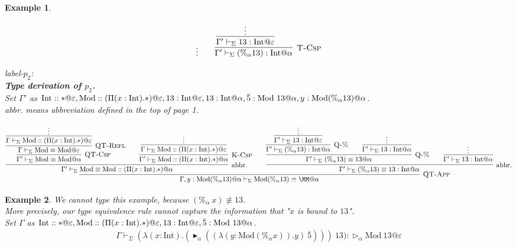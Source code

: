 \documentclass[9pt, a4paper]{extarticle}
\theoremstyle{break}
\newtheorem{ex}{Example}
\newcommand{\G}{\Gamma}
\newcommand{\V}{\vdash_\Sigma}
\newcommand{\TW}{\triangleright}
\newcommand{\TB}{\blacktriangleright}
\newcommand{\E}{\equiv}
\begin{document}
\begin{ex}
\begin{center}
$${{{							{\vdots}
						}
						\andalso
						\infer[\textsc{T-Csp}]
						{\G'\V (\%_\alpha 13):\I@\alpha}
						{
							\infer[]
							{\G'\V 13:\I@\varepsilon}
							{\vdots}
							\andalso
						}
					}
				}
			$$
		\end{center}
		label-$p_2$:\\
		{\bf{Type derivation of $p_2$}.}\\
		Set $\G'$ as $\I::*@\varepsilon,\M::(\Pi (x:\I).*)@\varepsilon,13:\I@\varepsilon,13:\I@\alpha,\bar{5}:\M\ 13@\alpha,y:\M (\%_\alpha 13)@\alpha$.\\
		abbr. means abbreviation defined in the top of page 1.
		\begin{center}
			$$
				\infer[\textsc{QT-App}]
				{\G,y:\M (\%_\alpha 13)@\alpha \V \M (\%_\alpha 13)\E\MM@\alpha}
				{
					\infer[\textrm{abbr.}]
					{\G' \V \M\E\M::(\Pi (x:\I).*)@\alpha}
					{
						\infer[\textsc{QT-Csp}]
						{\G' \V \M\E\M@\alpha}
						{
							\infer[\textsc{QT-Refl}]
							{\G\V \M\E\M@\varepsilon}
							{
								\infer[]
								{\G\V \M::(\Pi (x:\I).*)@\varepsilon}
								{
									\vdots
								}
							}
						}
						\andalso
						\infer[\textsc{K-Csp}]
						{\G' \V \M::(\Pi (x:\I).*)@\alpha}
						{
							\infer[]
							{\G \V\M::(\Pi (x:\I).*)@\varepsilon}
							{\vdots}
						}
					}
					\andalso
					\infer[\textrm{abbr.}]
					{\G' \V (\%_\alpha 13)\E 13:\I@\alpha}
					{
						\infer[\textsc{Q-\%}]
						{\G' \V (\%_\alpha 13)\E 13@\alpha}
						{
							\infer[\textsc{Q-\%}]
							{\G' \V (\%_\alpha 13):\I@\alpha}
							{
								\infer[]
								{\G' \V 13:\I@\varepsilon}
								{\vdots}
							}
							\andalso
							\infer[]
							{\G' \V 13:\I@\alpha}
							{\vdots}
						}
						\andalso
						\infer[]
						{\G' \V 13:\I@\alpha}
						{\vdots}
					}
				}
			$$
		\end{center}
	\end{ex}

	\begin{ex}
		\newcommand{\M}{\textrm{Mod}}
		\newcommand{\I}{\textrm{Int}}
		\newcommand{\GF}{\textrm{GF}}
		We cannot type this example, because $(\%_\alpha\ x) \not\E 13$.\\
		More precisely, our type equivalence rule cannot capture the information that "$x$ is bound to $13$".\\

		Set $\G$ as $\I::*@\varepsilon,\M::(\Pi (x:\I).*)@\varepsilon,13:\I@\varepsilon,\bar{5}:\M\ 13@\alpha$.
		\begin{align*}
			\G\V
			(\lambda (x:\I).
			(\TB_\alpha ((\lambda (y:\M (\%_\alpha x)).y)\ \bar{5})))\ 13):\TW_\alpha \M\ 13@\varepsilon
		\end{align*}
	\end{ex}
\end{document}
